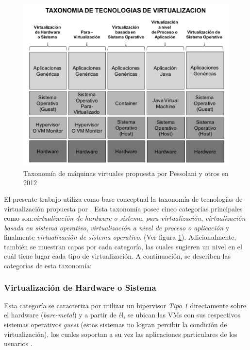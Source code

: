\begin{figure}[!htp]
	\centering
	\includegraphics[width=0.8 \linewidth]{Pictures/taxonomiaPessolani.png}
	\vspace{-0.2cm}
	\caption{Taxonomía de máquinas virtuales propuesta por Pessolani y otros en 2012\footnotemark[8]{}}
	\label{fig:taxonomiaPessolani}
\end{figure}


El presente trabajo utiliza como base conceptual la taxonomía de tecnologías de virtualización propuesta por \textcite{Pessolani2012}. Esta taxonomía posee cinco categorías principales como son:\textit{virtualización de hardware o sistema}, \textit{para-virtualización}, \textit{virtualización basada en sistema operativo}, \textit{virtualización a nivel de proceso o aplicación} y finalmente \textit{virtualización de sistema operativo}. (Ver figura \ref{fig:taxonomiaPessolani}). Adicionalmente, también se muestran capas por cada categoría, las cuales sugieren un nivel en el cuál tiene lugar cada tipo de virtualización. A continuación, se describen las categorías de esta taxonomía:\\


\subsubsection{Virtualización de Hardware o Sistema}
Esta categoría se caracteriza por utilizar un hipervisor \textit{Tipo 1} directamente sobre el hardware (\textit{bare-metal}) y a partir de él, se ubican las VMs con sus respectivos sistemas operativos \textit{guest} (estos sistemas no logran percibir la condición de virtualización), los cuales soportan a su vez las aplicaciones particulares de los usuarios \parencite{Pessolani2012}.\\

